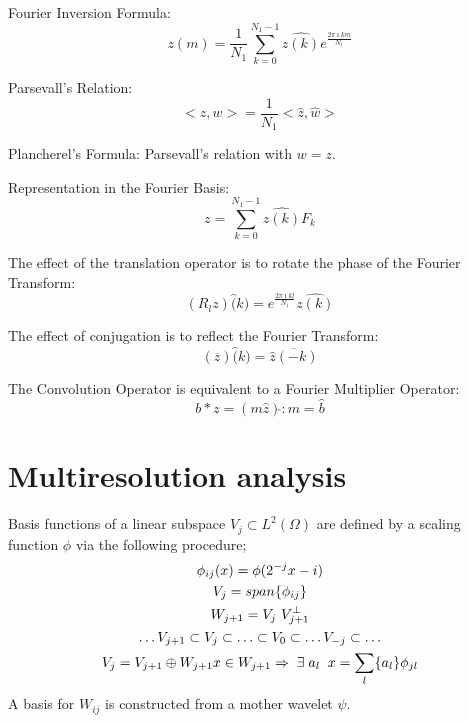 Fourier Inversion Formula:
\begin{equation*}
z(m)=\frac {1}{N_1}\sum\limits_{k=0}^{N_1-1} \hat{z(k)} e^{
\frac{2 \pi \imath k m}{N_1}}
\end{equation*}

Parsevall's Relation:
\begin{equation*}
<z,w>=\frac{1}{N_1}<\hat z,\hat w>
\end{equation*}

Plancherel's Formula: Parsevall's relation with $w=z$.

Representation in the Fourier Basis:
\begin{equation*}
z=\sum \limits_{k=0}^{N_1-1} \hat{z(k)} F_k
\end{equation*}

The effect of the translation operator is to rotate the phase
of the Fourier Transform:
\begin{equation*}
(R_l z)\hat(k)=e^{ \frac{2 \pi \imath k l}{N_1}}\widehat{z(k)}
\end{equation*}

The effect of conjugation is to reflect the Fourier Transform:
\begin{equation*}
(\overline{z})\hat(k)=\overline{\hat z(-k)}
\end{equation*}


The Convolution Operator is equivalent to a Fourier Multiplier
Operator:
\begin{equation*}
b * z=(m \hat z )\check{} \! : m=\hat b
\end{equation*}

\section{Multiresolution analysis} Basis functions of a linear
subspace $V_j \subset L^2(\Omega)$ are
defined by a scaling function $\phi$ %
via the following procedure;
\begin{gather*}
\phi_{ij}(x) = \phi(2^{-j} x-i)  \\
V_j = span \{ \phi_{ij} \} \\
W_{j+1}= V_j \ V_{j+1}^\bot \\
\hdots V_{j+1} \subset V_j \subset \hdots \subset V_0 \subset \hdots V_{-j}  \subset \hdots \\
V_j=V_{j+1} \oplus W_{j+1} x \in W_{j+1} \Rightarrow \; \exists \;
{a_l} \;\; x=\sum_l \{a_l\} \phi_{jl}
\end{gather*}
A basis for $W_{ij}$ is constructed from a mother wavelet
$\psi$.

